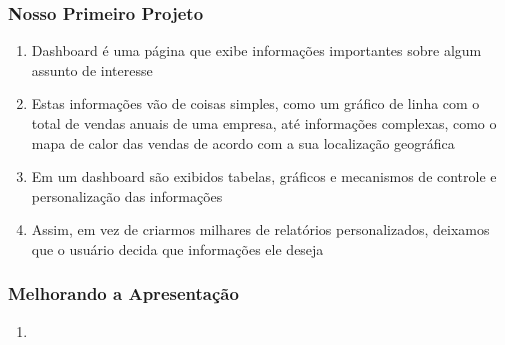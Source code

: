 \documentclass[12pt, compress, usetitleprogressbar]{beamer}\usepackage[]{graphicx}\usepackage[]{color}
\begin{document}









\begin{frame}

\frametitle{Nosso Primeiro Projeto}

\begin{enumerate}[label=$\bullet$, leftmargin=*]

  \item \alert{Dashboard} é uma página que exibe informações importantes sobre algum assunto de interesse

  \item Estas informações vão de coisas simples, como um gráfico de linha com o total de vendas anuais de uma empresa, até informações complexas, como o mapa de calor das vendas de acordo com a sua localização geográfica

  \item Em um dashboard são exibidos tabelas, gráficos e mecanismos de controle e personalização das informações

  \item Assim, em vez de criarmos milhares de relatórios personalizados, deixamos que o usuário decida que informações ele deseja 

\end{enumerate}

\end{frame}



























\begin{frame}

\frametitle{Melhorando a Apresentação}

\begin{enumerate}[label=$\bullet$, leftmargin=*]

  \item 

\end{enumerate}

\end{frame}
\end{document}
